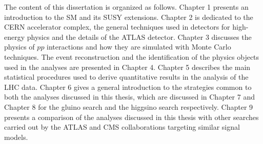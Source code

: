 \documentclass[11pt,a4paper]{article}
\begin{document}
The content of this dissertation is organized as follows. Chapter 1 presents an introduction to the SM and its SUSY extensions.
Chapter 2 is dedicated to the CERN accelerator complex, the general techniques used in detectors
for high-energy physics and the details of the ATLAS detector.
Chapter 3 discusses the physics of $pp$ interactions and how they are simulated with Monte Carlo techniques.
The event reconstruction and the identification of the physics objects used in the analyses are presented in Chapter 4.
Chapter 5 describes the main statistical procedures used to derive quantitative results in the analysis of the LHC data.
Chapter 6 gives a general introduction to the strategies common to both the analyses discussed in this thesis,
which are discussed in Chapter 7 and Chapter 8 for the gluino search and the
higgsino search respectively.
Chapter 9 presents a comparison of the analyses discussed in this thesis with other searches carried out
by the ATLAS and CMS collaborations targeting similar signal models.
 
\end{document}
